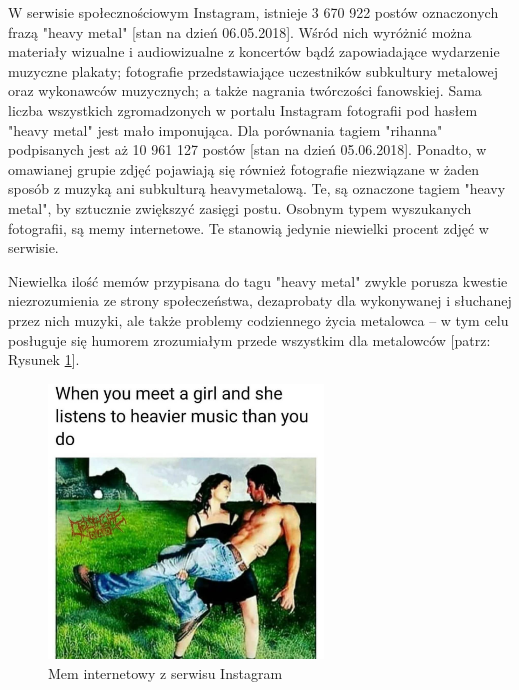 \documentclass[12pt, a4paper, titlepage]{report}
\begin{document}
W serwisie społecznościowym Instagram, istnieje 3 670 922 postów oznaczonych frazą "heavy metal" [stan na dzień 06.05.2018]. Wśród nich wyróżnić można materiały wizualne i audiowizualne z koncertów bądź zapowiadające wydarzenie muzyczne plakaty; fotografie przedstawiające uczestników subkultury metalowej oraz wykonawców muzycznych; a także nagrania twórczości fanowskiej. Sama liczba wszystkich zgromadzonych w portalu Instagram fotografii pod hasłem "heavy metal" jest mało imponująca. Dla porównania tagiem "rihanna" podpisanych jest aż 10 961 127 postów [stan na dzień 05.06.2018]. Ponadto, w omawianej grupie zdjęć pojawiają się również fotografie niezwiązane w żaden sposób z muzyką ani subkulturą heavymetalową. Te, są oznaczone tagiem "heavy metal", by sztucznie zwiększyć zasięgi postu. Osobnym typem wyszukanych fotografii, są memy internetowe. Te stanowią jedynie niewielki procent zdjęć w serwisie.

Niewielka ilość memów przypisana do tagu "heavy metal" zwykle porusza kwestie niezrozumienia ze strony społeczeństwa, dezaprobaty dla wykonywanej i słuchanej przez nich muzyki, ale także problemy codziennego życia metalowca -- w tym celu posługuje się humorem zrozumiałym przede wszystkim dla metalowców [patrz: Rysunek \ref{pic1}]. 

\vspace{0.5cm}
\begin{figure}[htb!]
\centering
\includegraphics[width=0.65\textwidth]{./img/mem.jpg}
\caption{Mem internetowy z serwisu Instagram}
\label{pic1}
\end{figure}
\end{document}
